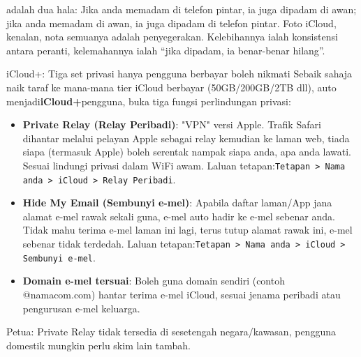 adalah dua hala: Jika anda memadam di telefon pintar, ia juga dipadam di awan; jika anda memadam di awan, ia juga dipadam di telefon pintar. Foto iCloud, kenalan, nota semuanya adalah penyegerakan. Kelebihannya ialah konsistensi antara peranti, kelemahannya ialah “jika dipadam, ia benar-benar hilang”.

\begin{tcbinfo}{iCloud+: Tiga set privasi hanya pengguna berbayar boleh nikmati}
Sebaik sahaja naik taraf ke mana-mana tier iCloud berbayar (50GB/200GB/2TB dll), auto menjadi\textbf{iCloud+}pengguna, buka tiga fungsi perlindungan privasi:

\begin{itemize}
  \item \textbf{Private Relay (Relay Peribadi)}: "VPN" versi Apple. Trafik Safari dihantar melalui pelayan Apple sebagai relay kemudian ke laman web, tiada siapa (termasuk Apple) boleh serentak nampak siapa anda, apa anda lawati. Sesuai lindungi privasi dalam WiFi awam. Laluan tetapan:\texttt{Tetapan > Nama anda > iCloud > Relay Peribadi}.
  \item \textbf{Hide My Email (Sembunyi e-mel)}: Apabila daftar laman/App jana alamat e-mel rawak sekali guna, e-mel auto hadir ke e-mel sebenar anda. Tidak mahu terima e-mel laman ini lagi, terus tutup alamat rawak ini, e-mel sebenar tidak terdedah. Laluan tetapan:\texttt{Tetapan > Nama anda > iCloud > Sembunyi e-\allowbreak mel}.
  \item \textbf{Domain e-mel tersuai}: Boleh guna domain sendiri (contoh @namacom.com) hantar terima e-mel iCloud, sesuai jenama peribadi atau pengurusan e-mel keluarga.
\end{itemize}

Petua: Private Relay tidak tersedia di sesetengah negara/kawasan, pengguna domestik mungkin perlu skim lain tambah.

\end{tcbinfo}

